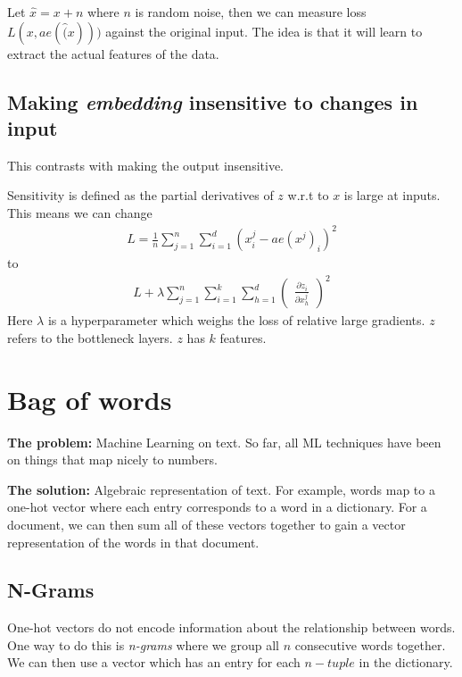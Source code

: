 \documentclass{article}
\begin{document}
      Let $\hat{x} = x + n$ where $n$ is random noise, then we can measure loss $L(x, ae(\hat(x)))$ against the original input. The idea is that it will learn to extract the actual features of the data. 

    \subsection{Making \emph{embedding} insensitive to changes in input}
      This contrasts with making the output insensitive.

    Sensitivity is defined as the partial derivatives of $z$ w.r.t to $x$ is large at inputs. This means we can change
    \begin{align}
      L = \frac{1}{n}\sum_{j=1}^{n}{
        \sum_{i=1}^{d}{
          (x_i^j - ae(x^j)_i)^2
        }
      }
    \end{align}
    to
    \begin{align}
      L + \lambda 
      \sum_{j=1}^{n}{
        \sum_{i=1}^{k}{
          \sum_{h=1}^{d}{
            \begin{pmatrix}
              \frac{\partial z_i}{\partial x_h^j}
            \end{pmatrix}^2
          }
        }
      }
    \end{align}
    Here $\lambda$ is a hyperparameter which weighs the loss of relative large gradients. $z$ refers to the bottleneck layers. $z$ has $k$ features. 

\section{Bag of words}
    \textbf{The problem:} Machine Learning on text. So far, all ML techniques have been on things that map nicely to numbers. 

    \textbf{The solution:} Algebraic representation of text. For example, words map to a one-hot vector where each entry corresponds to a word in a dictionary. For a document, we can then sum all of these vectors together to gain a vector representation of the words in that document.

    \subsection{N-Grams}
      One-hot vectors do not encode information about the relationship between words. One way to do this is \emph{n-grams} where we group all $n$ consecutive words together. We can then use a vector which has an entry for each $n-tuple$ in the dictionary. 
\end{document}
